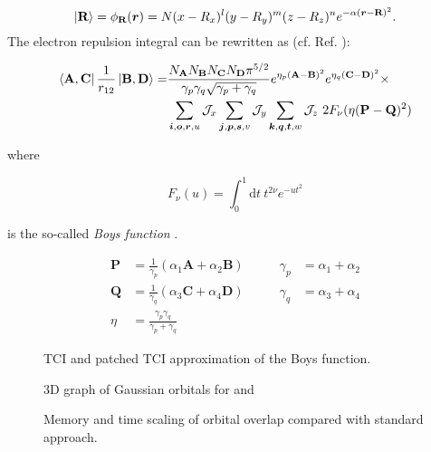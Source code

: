 \begin{equation}
    \ket{\textbf{R}} = \phi_\textbf{R}(\bm{r}) = N (x - R_x)^l (y - R_y)^m (z - R_z)^n e^{-\alpha (\bm{r} - \textbf{R})^2}.
\end{equation}
The electron repulsion integral can be rewritten as (cf. Ref. \cite{Petersson2010}): 

\begin{align}
    \bra{\textbf{A}, \textbf{C}}\frac{1}{r_{12}}\ket{\textbf{B}, \textbf{D}} =& \frac{N_\textbf{A}N_\textbf{B}N_\textbf{C}N_\textbf{D} \pi^{5/2}}{\gamma_p\gamma_q\sqrt{\gamma_p + \gamma_q}} e^{\eta_p(\textbf{A} - \textbf{B})^2} e^{\eta_q(\textbf{C} - \textbf{D})^2} \times \\
    \nonumber &\sum_{\bm{i},\bm{o},\bm{r},u}\mathcal{J}_x \sum_{\bm{j},\bm{p},\bm{s},v} \mathcal{J}_y \sum_{\bm{k},\bm{q},\bm{t},w} \mathcal{J}_z\ 2F_\nu (\eta (\textbf{P} - \textbf{Q})^2)
\end{align}

where

\begin{equation} 
    F_\nu(u) = \int_{0}^{1} \text{d}t\ t^{2\nu} e ^{-ut^2}
\end{equation}

is the so-called \textit{Boys function} \cite{Boys1950}.

    
\begin{equation}
    \begin{alignedat}{5}      
      \textbf{P} &= \frac{1}{\gamma_p}(\alpha_1 \textbf{A} + \alpha_2 \textbf{B}) &\qquad \gamma_p &= \alpha_1 + \alpha_2 \\[6pt]
      \textbf{Q} &= \frac{1}{\gamma_q}(\alpha_3 \textbf{C} + \alpha_4 \textbf{D}) &\qquad \gamma_q &= \alpha_3 + \alpha_4 \\[6pt]
      \eta &= \frac{\gamma_p\gamma_q}{\gamma_p + \gamma_q}
    \end{alignedat}
\end{equation}
    

\begin{figure}[ht!]
    \caption{TCI and patched TCI approximation of the Boys function.}
\end{figure}

\begin{figure}[ht!]
    \caption{3D graph of Gaussian orbitals for  and }
\end{figure}

\begin{figure}[ht!]
    \caption{Memory and time scaling of orbital overlap compared with standard approach. }
\end{figure}


